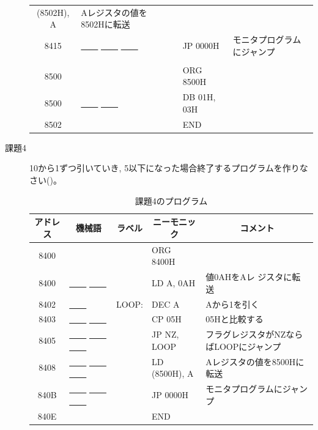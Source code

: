 \begin{description}
\begin{table}
\begin{center}
\begin{tabular}{|c|l|ll|l|}
                (8502H), A& Aレジスタの値を8502Hに転送\\
   8415&   \underline{~~~~} \underline{~~~~} \underline{~~~~}   &        &JP
                0000H& モニタプログラムにジャンプ\\
       &             &        &&\\
   8500&             &        &ORG 8500H&\\
   8500&   \underline{~~~~} \underline{~~~~}      &        &DB 01H, 03H&\\
   8502&             &        &END&\\
\hline
\end{tabular}
\end{center}
\end{table}


\item[課題4] 10から1ずつ引いていき, 5以下になった場合終了するプログラムを作りな
           さい()。


\begin{table}
\begin{center}
\caption{課題4のプログラム}
\label{tab:q1-4}
\small
\begin{tabular}{|c|l|ll|l|}
\hline
アドレス& \multicolumn{1}{|c|}{機械語}&\multicolumn{1}{|c}{ラベル}&\multicolumn{1}{c|}{ニーモニック}&\multicolumn{1}{|c|}{コメント}\\
\hline
   8400&            &         &ORG 8400H&\\
   8400&   \underline{~~~~} \underline{~~~~}    &         &LD A, 0AH& 値0AHをAレ
                    ジスタに転送\\
   8402&   \underline{~~~~}       &     LOOP:&    DEC A& Aから1を引く\\
   8403&   \underline{~~~~} \underline{~~~~}    &         &CP 05H&05Hと比較する\\
   8405&  \underline{~~~~} \underline{~~~~} \underline{~~~~}  &         &JP NZ,
                LOOP& フラグレジスタがNZならばLOOPにジャンプ\\
   8408&   \underline{~~~~} \underline{~~~~} \underline{~~~~} &         &LD
                (8500H), A& Aレジスタの値を8500Hに転送\\
   840B&  \underline{~~~~} \underline{~~~~} \underline{~~~~} &         &JP
                0000H& モニタプログラムにジャンプ\\
   840E&            &         &END&\\
\hline
\end{tabular}
\end{center}
\end{table}


\end{description}

